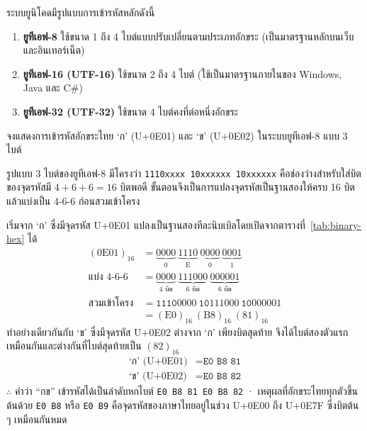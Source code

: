 \begin{definition}
\label{def:unicode-encodings}
ระบบยูนิโคดมีรูปแบบการเข้ารหัสหลักดังนี้
\begin{enumerate}
    \item \textbf{ยูทีเอฟ-8} ใช้ขนาด 1 ถึง 4 ไบต์แบบปรับเปลี่ยนตามประเภทอักขระ (เป็นมาตรฐานหลักบนเว็บและอินเทอร์เน็ต)
    \item \textbf{ยูทีเอฟ-16 (UTF-16)} ใช้ขนาด 2 ถึง 4 ไบต์ (ใช้เป็นมาตรฐานภายในของ Windows, Java และ C\#)
    \item \textbf{ยูทีเอฟ-32 (UTF-32)} ใช้ขนาด 4 ไบต์คงที่ต่อหนึ่งอักขระ
\end{enumerate}
\end{definition}

\begin{ex}
\label{ex:utf8-thai}
จงแสดงการเข้ารหัสอักขระไทย `ก' (U+0E01) และ `ข' (U+0E02) ในระบบยูทีเอฟ-8 แบบ 3 ไบต์
\end{ex}
\begin{solution}
รูปแบบ 3 ไบต์ของยูทีเอฟ-8 มีโครงว่า \texttt{1110xxxx 10xxxxxx 10xxxxxx} คือช่องว่างสำหรับใส่บิตของจุดรหัสมี $4+6+6 = 16$ บิตพอดี ขั้นตอนจึงเป็นการแปลงจุดรหัสเป็นฐานสองให้ครบ 16 บิต แล้วแบ่งเป็น 4-6-6 ก่อนสวมเข้าโครง

เริ่มจาก `ก' ซึ่งมีจุดรหัส U+0E01 แปลงเป็นฐานสองทีละนิบเบิลโดยเปิดจากตารางที่~\ref{tab:binary-hex} ได้
\begin{align*}
(0\mathrm{E}01)_{16} &= \underbrace{0000}_{0}\ \underbrace{1110}_{\mathrm{E}}\ \underbrace{0000}_{0}\ \underbrace{0001}_{1}\\
\text{แบ่ง 4-6-6} &= \underbrace{0000}_{4\text{ บิต}}\ \underbrace{111000}_{6\text{ บิต}}\ \underbrace{000001}_{6\text{ บิต}}\\
\text{สวมเข้าโครง} &= \texttt{1110}0000\ \texttt{10}111000\ \texttt{10}000001\\
&= (\mathrm{E}0)_{16}\ (\mathrm{B}8)_{16}\ (81)_{16}
\end{align*}
ทำอย่างเดียวกันกับ `ข' ซึ่งมีจุดรหัส U+0E02 ต่างจาก `ก' เพียงบิตสุดท้าย จึงได้ไบต์สองตัวแรกเหมือนกันและต่างกันที่ไบต์สุดท้ายเป็น $(82)_{16}$
\begin{align*}
\text{`ก' (U+0E01)} &= \texttt{E0 B8 81}\\
\text{`ข' (U+0E02)} &= \texttt{E0 B8 82}
\end{align*}
$\therefore$ คำว่า ``กข'' เข้ารหัสได้เป็นลำดับหกไบต์ \texttt{E0 B8 81 E0 B8 82} · เหตุผลที่อักขระไทยทุกตัวขึ้นต้นด้วย \texttt{E0 B8} หรือ \texttt{E0 B9} คือจุดรหัสของภาษาไทยอยู่ในช่วง U+0E00 ถึง U+0E7F ซึ่งบิตต้น ๆ เหมือนกันหมด \solhere
\end{solution}


